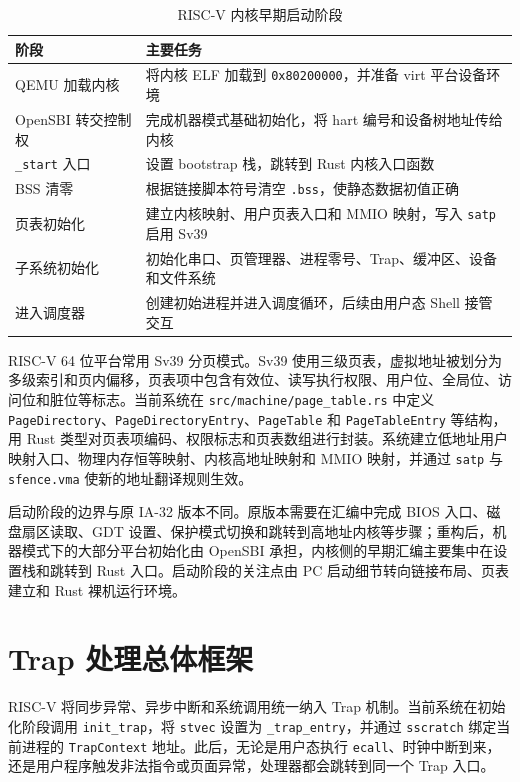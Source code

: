 \begin{table}[htbp]
  \centering
  \caption{RISC-V 内核早期启动阶段}\label{tab:riscv-boot-steps}
  \renewcommand{\arraystretch}{1.32}
  \begin{tabular}{p{}p{}}
    \toprule
    阶段 & 主要任务 \\
    \midrule
    QEMU 加载内核 & 将内核 ELF 加载到 \verb|0x80200000|，并准备 virt 平台设备环境 \\
    OpenSBI 转交控制权 & 完成机器模式基础初始化，将 hart 编号和设备树地址传给内核 \\
    \verb|_start| 入口 & 设置 bootstrap 栈，跳转到 Rust 内核入口函数 \\
    BSS 清零 & 根据链接脚本符号清空 \verb|.bss|，使静态数据初值正确 \\
    页表初始化 & 建立内核映射、用户页表入口和 MMIO 映射，写入 \verb|satp| 启用 Sv39 \\
    子系统初始化 & 初始化串口、页管理器、进程零号、Trap、缓冲区、设备和文件系统 \\
    进入调度器 & 创建初始进程并进入调度循环，后续由用户态 Shell 接管交互 \\
    \bottomrule
  \end{tabular}
\end{table}

RISC-V 64 位平台常用 Sv39 分页模式。Sv39 使用三级页表，虚拟地址被划分为多级索引和页内偏移，页表项中包含有效位、读写执行权限、用户位、全局位、访问位和脏位等标志\cite{riscv_unprivileged_20191213,riscv_privileged_20211203}。当前系统在 \verb|src/machine/page_table.rs| 中定义 \verb|PageDirectory|、\verb|PageDirectoryEntry|、\verb|PageTable| 和 \verb|PageTableEntry| 等结构，用 Rust 类型对页表项编码、权限标志和页表数组进行封装。系统建立低地址用户映射入口、物理内存恒等映射、内核高地址映射和 MMIO 映射，并通过 \verb|satp| 与 \verb|sfence.vma| 使新的地址翻译规则生效。

启动阶段的边界与原 IA-32 版本不同。原版本需要在汇编中完成 BIOS 入口、磁盘扇区读取、GDT 设置、保护模式切换和跳转到高地址内核等步骤；重构后，机器模式下的大部分平台初始化由 OpenSBI 承担，内核侧的早期汇编主要集中在设置栈和跳转到 Rust 入口。启动阶段的关注点由 PC 启动细节转向链接布局、页表建立和 Rust 裸机运行环境。

\section{Trap 处理总体框架}

RISC-V 将同步异常、异步中断和系统调用统一纳入 Trap 机制。当前系统在初始化阶段调用 \verb|init_trap|，将 \verb|stvec| 设置为 \verb|_trap_entry|，并通过 \verb|sscratch| 绑定当前进程的 \verb|TrapContext| 地址。此后，无论是用户态执行 \verb|ecall|、时钟中断到来，还是用户程序触发非法指令或页面异常，处理器都会跳转到同一个 Trap 入口。

